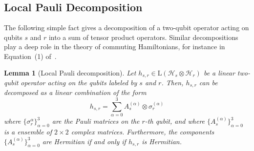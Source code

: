 \documentclass[11pt]{article}
\theoremstyle{plain}
\newtheorem{lemma}[theorem]{Lemma}
\begin{document}
\subsection{Local Pauli Decomposition}
The following simple fact gives a decomposition of a two-qubit operator acting on qubits $s$ and $r$ into a sum of tensor product operators. Similar decompositions play a deep role in the theory of commuting Hamiltonians, for instance in Equation~(1) of~\cite{aharonov2011complexity}.

\begin{lemma}[Local Pauli decomposition]\label{algebra-fact-pauli-decomposition}
    Let $h_{s,r} \in \mathrm{L}(\mathcal{H}_s \otimes \mathcal{H}_r)$ be a linear two-qubit operator acting on the qubits labeled by $s$ and $r$. Then, $h_{s,r}$ can be decomposed as a linear combination of the form
    \begin{equation}\label{eqn:local-pauli-decomposition}
        h_{s,r} = \sum\limits_{\alpha = 0}^{3} A_s^{(\alpha)} \otimes \sigma_r^{(\alpha)}
    \end{equation}
where $\{\sigma_r^{\alpha}\}_{\alpha=0}^3$ are the Pauli matrices on the $r$-th qubit, and where $\{A_s^{(\alpha)}\}_{\alpha=0}^3$ is a ensemble of $2 \times 2$ complex matrices. Furthermore, the components $\{A_s^{(\alpha)}\}_{\alpha=0}^3$ are Hermitian if and only if $h_{s, r}$ is Hermitian.
\end{lemma}
\end{document}
